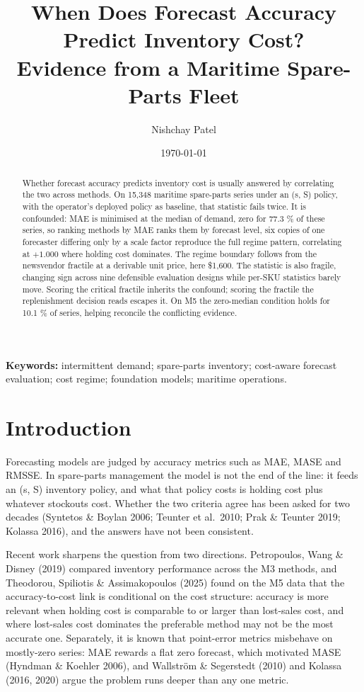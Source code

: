 \documentclass[11pt]{article}
\title{When Does Forecast Accuracy Predict Inventory Cost?\\[2pt]
\large Evidence from a Maritime Spare-Parts Fleet}
\author{Nishchay Patel}
\date{\today}
\begin{document}
\maketitle

\begin{abstract}
Whether forecast accuracy predicts inventory cost is usually answered by
correlating the two across methods. On 15{,}348 maritime
spare-parts series under an (s, S) policy, with the operator's deployed policy
as baseline, that statistic fails twice. It is confounded: MAE is minimised at
the median of demand, zero for 77.3 \% of these series, so ranking
methods by MAE ranks them by forecast level, six copies of one forecaster differing
only by a scale factor reproduce the full regime pattern, correlating at
$+1.000$ where holding cost dominates. The regime boundary follows from the
newsvendor fractile at a derivable unit price, here \$1{,}600. The
statistic is also fragile, changing sign across nine defensible evaluation
designs while per-SKU statistics barely move. Scoring
the critical fractile inherits the confound; scoring the fractile the
replenishment decision reads escapes it. On M5 the zero-median condition holds
for 10.1 \% of series, helping reconcile the conflicting evidence.
\end{abstract}

\noindent\textbf{Keywords:} intermittent demand; spare-parts inventory;
cost-aware forecast evaluation; cost regime; foundation models; maritime
operations.

\section{Introduction}

Forecasting models are judged by accuracy metrics such as MAE, MASE and RMSSE.
In spare-parts management the model is not the end of the line: it feeds an
(s, S) inventory policy, and what that policy costs is holding cost plus
whatever stockouts cost. Whether the two criteria agree has been asked for two
decades (Syntetos \& Boylan 2006; Teunter et al.\ 2010; Prak \& Teunter 2019;
Kolassa 2016), and the answers have not been consistent.

Recent work sharpens the question from two directions. Petropoulos, Wang \&
Disney (2019) compared inventory performance across the M3 methods, and
Theodorou, Spiliotis \& Assimakopoulos (2025) found on the M5 data that the
accuracy-to-cost link is conditional on the cost structure: accuracy is more
relevant when holding cost is comparable to or larger than lost-sales cost,
and where lost-sales cost dominates the preferable method may not be the most
accurate one. Separately, it is known that point-error metrics misbehave on
mostly-zero series: MAE rewards a flat zero forecast, which motivated MASE
(Hyndman \& Koehler 2006), and Wallstr\"om \& Segerstedt (2010) and Kolassa
(2016, 2020) argue the problem runs deeper than any one metric.
\end{document}
